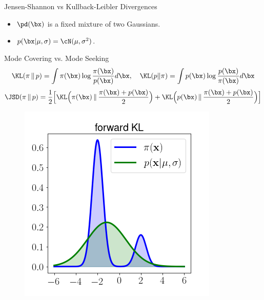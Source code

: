 \documentclass{beamer}
\begin{document}
\begin{frame}{Jensen-Shannon vs Kullback-Leibler Divergences}
	\begin{itemize}
		\item $\pd(\bx)$ is a fixed mixture of two Gaussians.
		\item $p(\bx | \mu, \sigma) = \cN(\mu, \sigma^2)$.
	\end{itemize}
	\begin{block}{Mode Covering vs. Mode Seeking}
		\vspace{-0.7cm}
		\[
			\KL(\pi \,\|\, p) = \int \pi(\bx) \log \frac{\pi(\bx)}{p(\bx)}d\bx, 
			\quad \KL(p \| \pi) = \int p(\bx) \log \frac{p(\bx)}{\pi(\bx)}d\bx
		\]
		\[
			\JSD(\pi \,\|\, p) = \frac{1}{2} \Bigl[\KL \Bigl(\pi(\bx) \,\|\, \frac{\pi(\bx) + p(\bx)}{2}\Bigr) + \KL \Bigl(p(\bx) \,\|\, \frac{\pi(\bx) + p(\bx)}{2}\Bigr) \Bigr]
		\]
		\vspace{-0.7cm}
		\eqpause
		\begin{minipage}[t]{0.33\columnwidth}
			\begin{figure}
				\includegraphics[width=\linewidth]{figs/forward_KL}
			\end{figure}
		\end{minipage}%
		\begin{minipage}[t]{0.33\columnwidth}
			\begin{figure}

\end{figure}
\end{minipage}
\end{block}
\end{frame}
\end{document}
